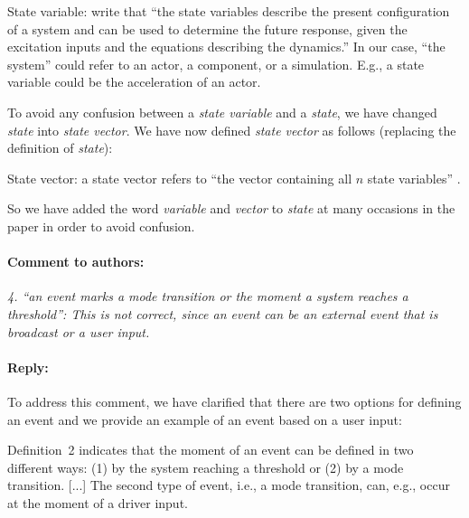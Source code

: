 \documentclass[10pt,final,a4paper,oneside,onecolumn]{article}
\newcommand{\toauthor}{\paragraph*{Comment to authors:} \itshape}
\newcommand{\fromauthor}{\paragraph*{Reply:} \normalfont}
\newcommand{\cstart}{\cbstart\color{red}}
\newcommand{\cend}{\cbend\color{black}}
\begin{document}
\cstart State variable: \textcite[p.~163]{dorf2011modern} write that ``the state variables describe the present configuration of a system and can be used to determine the future response, given the excitation inputs and the equations describing the dynamics.'' In our case, ``the system'' could refer to an actor, a component, or a simulation. E.g., a state variable could be the acceleration of an actor.\cend

To avoid any confusion between a \emph{state variable} and a \emph{state}, we have changed \emph{state} into \emph{state \cstart vector\cend}. We have now defined \emph{state vector} as follows (replacing the definition of \emph{state}):

\cstart State vector: a state vector refers to ``the vector containing all $n$ state variables'' \autocite[p.~233]{dorf2011modern}.\cend

So we have added the word \emph{variable} and \emph{vector} to \emph{state} at many occasions in the paper in order to avoid confusion.



\toauthor 4. ``an event marks a mode transition or the moment a system reaches a threshold'': This is not correct, since an event can be an external event that is broadcast or a user input.


\fromauthor To address this comment, we have clarified that there are two options for defining an event and we provide an example of an event based on a user input:

\cstart
Definition~2 indicates that the moment of an event can be defined in two different ways: (1) by the system reaching a threshold or (2) by a mode transition. \cend [...] \cstart The second type of event, i.e., a mode transition, can, e.g., occur at the moment of a driver input.\cend
\end{document}
